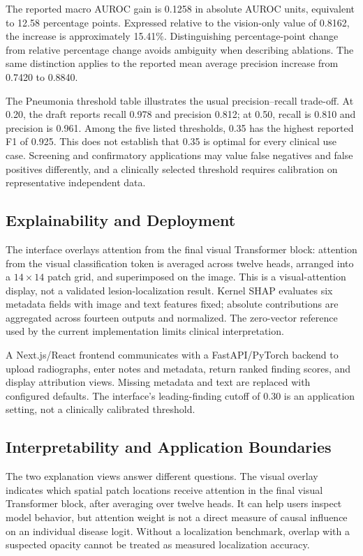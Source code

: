\documentclass[conference,letterpaper]{IEEEtran}
\begin{document}
The reported macro AUROC gain is 0.1258 in absolute AUROC units, equivalent to 12.58 percentage points. Expressed relative to the vision-only value of 0.8162, the increase is approximately 15.41\%. Distinguishing percentage-point change from relative percentage change avoids ambiguity when describing ablations. The same distinction applies to the reported mean average precision increase from 0.7420 to 0.8840.

The Pneumonia threshold table illustrates the usual precision--recall trade-off. At 0.20, the draft reports recall 0.978 and precision 0.812; at 0.50, recall is 0.810 and precision is 0.961. Among the five listed thresholds, 0.35 has the highest reported F1 of 0.925. This does not establish that 0.35 is optimal for every clinical use case. Screening and confirmatory applications may value false negatives and false positives differently, and a clinically selected threshold requires calibration on representative independent data.

\subsection{Explainability and Deployment}
The interface overlays attention from the final visual Transformer block: attention from the visual classification token is averaged across twelve heads, arranged into a $14\times14$ patch grid, and superimposed on the image. This is a visual-attention display, not a validated lesion-localization result. Kernel SHAP evaluates six metadata fields with image and text features fixed; absolute contributions are aggregated across fourteen outputs and normalized. The zero-vector reference used by the current implementation limits clinical interpretation.

A Next.js/React frontend communicates with a FastAPI/PyTorch backend to upload radiographs, enter notes and metadata, return ranked finding scores, and display attribution views. Missing metadata and text are replaced with configured defaults. The interface's leading-finding cutoff of 0.30 is an application setting, not a clinically calibrated threshold.

\subsection{Interpretability and Application Boundaries}
The two explanation views answer different questions. The visual overlay indicates which spatial patch locations receive attention in the final visual Transformer block, after averaging over twelve heads. It can help users inspect model behavior, but attention weight is not a direct measure of causal influence on an individual disease logit. Without a localization benchmark, overlap with a suspected opacity cannot be treated as measured localization accuracy.
\end{document}
